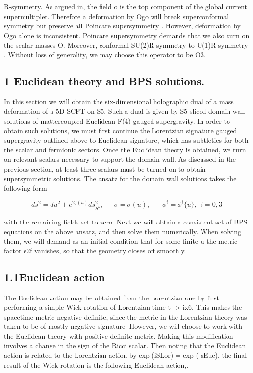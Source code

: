 \documentclass{article}
\begin{document}
\sloppy

R-symmetry. As argued in, the field o is the top component of the global current
supermultiplet. Therefore a deformation by Ogo will break superconformal symmetry but
preserve all Poincare supersymmetry . However, deformation by Ogo alone is inconsistent.
Poincare supersymmetry demands that we also turn on the scalar masses O. Moreover,
conformal SU(2)R symmetry to U(1)R symmetry . Without loss of generality, we may choose
this operator to be O3.


\subsection*{1 Euclidean theory and BPS solutions.}


In this section we will obtain the six-dimensional holographic dual of a mass deformation
of a 5D SCFT on S5. Such a dual is given by S5-sliced domain wall solutions of mattercoupled Euclidean F(4) gauged supergravity. In order to obtain such solutions, we must first
continue the Lorentzian signature gauged supergravity outlined above to Euclidean signature,
which has subtleties for both the scalar and fermionic sectors. Once the Euclidean theory
is obtained, we turn on relevant scalars necessary to support the domain wall. As discussed
in the previous section, at least three scalars must be turned on to obtain supersymmetric
solutions. The ansatz for the domain wall solutions takes the following form


\begin{equation}
d s ^ { 2 } = d u ^ { 2 } + e ^ { 2 f ( u ) } d s _ { S ^ { k } } ^ { 2 }, ~ ~ ~ ~ ~ ~ ~ \sigma = \sigma ( u ), ~ ~ ~ ~ ~ ~ ~ ~ \phi ^ { i } = \phi ^ { i } \{ u \}, ~ ~ i = 0, 3 ~
\end{equation}


with the remaining fields set to zero. Next we will obtain a consistent set of BPS equations
on the above ansatz, and then solve them numerically. When solving them, we will demand
as an initial condition that for some finite u the metric factor e2f vanishes, so that the
geometry closes off smoothly.


\subsection*{1.1Euclidean action}


The Euclidean action may be obtained from the Lorentzian one by first performing a simple
Wick rotation of Lorentzian time t -> ix6. This makes the spacetime metric negative definite, since the metric in the Lorentzian theory was taken to be of mostly negative signature.
However, we will choose to work with the Euclidean theory with positive definite metric.
Making this modification involves a change in the sign of the Ricci scalar. Then noting that
the Euclidean action is related to the Lorentzian action by exp (iSLor) = exp (-sEuc), the
final result of the Wick rotation is the following Euclidean action,.
\end{document}
